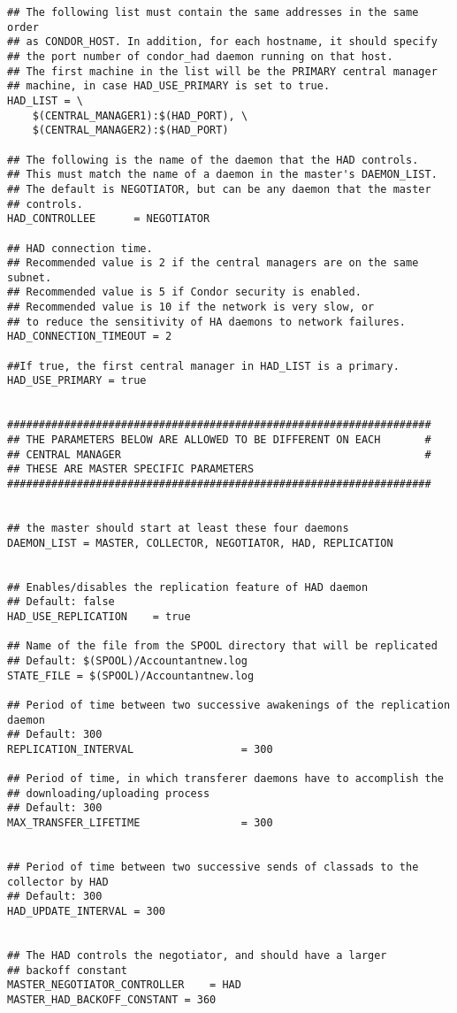 \begin{verbatim}
## The following list must contain the same addresses in the same order 
## as CONDOR_HOST. In addition, for each hostname, it should specify 
## the port number of condor_had daemon running on that host.
## The first machine in the list will be the PRIMARY central manager
## machine, in case HAD_USE_PRIMARY is set to true.
HAD_LIST = \
	$(CENTRAL_MANAGER1):$(HAD_PORT), \
	$(CENTRAL_MANAGER2):$(HAD_PORT)

## The following is the name of the daemon that the HAD controls.
## This must match the name of a daemon in the master's DAEMON_LIST.
## The default is NEGOTIATOR, but can be any daemon that the master
## controls.
HAD_CONTROLLEE		= NEGOTIATOR

## HAD connection time.
## Recommended value is 2 if the central managers are on the same subnet.
## Recommended value is 5 if Condor security is enabled.
## Recommended value is 10 if the network is very slow, or
## to reduce the sensitivity of HA daemons to network failures.
HAD_CONNECTION_TIMEOUT = 2

##If true, the first central manager in HAD_LIST is a primary.
HAD_USE_PRIMARY = true


###################################################################
## THE PARAMETERS BELOW ARE ALLOWED TO BE DIFFERENT ON EACH       #
## CENTRAL MANAGER                                                #
## THESE ARE MASTER SPECIFIC PARAMETERS
###################################################################


## the master should start at least these four daemons
DAEMON_LIST = MASTER, COLLECTOR, NEGOTIATOR, HAD, REPLICATION


## Enables/disables the replication feature of HAD daemon
## Default: false
HAD_USE_REPLICATION    = true

## Name of the file from the SPOOL directory that will be replicated
## Default: $(SPOOL)/Accountantnew.log
STATE_FILE = $(SPOOL)/Accountantnew.log

## Period of time between two successive awakenings of the replication daemon
## Default: 300
REPLICATION_INTERVAL                 = 300

## Period of time, in which transferer daemons have to accomplish the 
## downloading/uploading process
## Default: 300
MAX_TRANSFER_LIFETIME                = 300


## Period of time between two successive sends of classads to the collector by HAD
## Default: 300
HAD_UPDATE_INTERVAL = 300


## The HAD controls the negotiator, and should have a larger
## backoff constant
MASTER_NEGOTIATOR_CONTROLLER	= HAD
MASTER_HAD_BACKOFF_CONSTANT	= 360
\end{verbatim}
\normalsize

